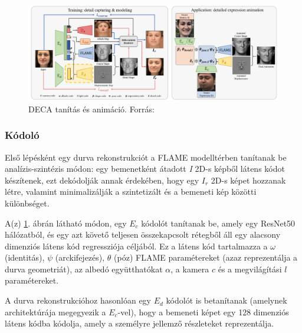 \documentclass[12pt,a4]{article}
\begin{document}
            \begin{figure}[h]	
     		 \centering
     		 \includegraphics[width=1\linewidth]{deca}
     		 \caption{ DECA tanítás és animáció.
     			    Forrás: \cite{deca}}
                \label{fig:deca}
     	      \end{figure}

            \subsubsection{Kódoló} \label{Kódoló}
    	        Első lépésként egy durva rekonstrukciót a FLAME modelltérben \cite{flame}
                tanítanak be analízis-szintézis módon: egy bemenetként átadott \textit{I} 2D-s képből látens kódot készítenek, ezt dekódolják annak érdekében, hogy egy $I_{r}$ 2D-s képet hozzanak létre, valamint minimalizálják a szintetizált és a bemeneti kép közötti különbséget.
            
    	        A(z) \ref{fig:deca}. ábrán látható módon, egy $E_{c}$ kódolót tanítanak be, amely egy ResNet50 \cite{liwen} hálózatból, és egy azt követő teljesen összekapcsolt rétegből áll egy alacsony dimenziós látens kód regressziója céljából. Ez a látens kód tartalmazza a $\omega$ (identitás), $\psi$ (arckifejezés), $\theta$ (póz) FLAME \cite{flame} paramétereket (azaz reprezentálja a durva geometriát), az albedó együtthatókat $\alpha$, a kamera $c$ és a megvilágítási $l$ paramétereket.
    
                A durva rekonstrukcióhoz hasonlóan egy $E_{d}$ kódolót is betanítanak (amelynek architektúrája megegyezik a $E_{c}$-vel), hogy a bemeneti képet egy 128 dimenziós látens kódba kódolja, amely a személyre jellemző részleteket reprezentálja. 
    
\end{document}
